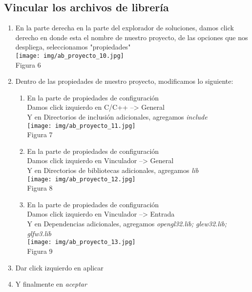 \documentclass[12pt, a4paper]{article}
\begin{document}
\subsection{Vincular los archivos de librería}	
	\begin{enumerate}
	\raggedright 	
	\item En la parte derecha en la parte del explorador de soluciones, damos click derecho en donde esta el nombre de nuestro proyecto, de las opciones que nos despliega, seleccionamos "propiedades" \\[.25cm] 
	\centering 
	\texttt{[image: img/ab\_proyecto\_10.jpg]}\\[.25cm] %
	Figura 6 \\[.5cm]
	\raggedright 	
	\item Dentro de las propiedades de nuestro proyecto, modificamos lo siguiente:
		\begin{enumerate}
			\item En la parte de propiedades de configuración
			\\Damos click izquierdo en C/C++ --> General \\
			Y en Directorios de inclusión adicionales, agregamos {\itshape include} \\[.25cm] 
			\centering 
			\texttt{[image: img/ab\_proyecto\_11.jpg]}\\[.25cm] %
			Figura 7 \\[.5cm]
			\raggedright 
			\item En la parte de propiedades de configuración
			\\Damos click izquierdo en Vinculador --> General \\
			Y en Directorios de bibliotecas adicionales, agregamos {\itshape lib} \\[.25cm] 
			\centering 
			\texttt{[image: img/ab\_proyecto\_12.jpg]}\\[.25cm] %
			Figura 8 \\[.5cm]
			
			\raggedright 
			\item En la parte de propiedades de configuración
			\\Damos click izquierdo en Vinculador --> Entrada \\
			Y en Dependencias adicionales, agregamos {\itshape opengl32.lib; glew32.lib; glfw3.lib} \\[.25cm] 
			\centering 
			\texttt{[image: img/ab\_proyecto\_13.jpg]}\\[.25cm] %
			Figura 9 \\[.5cm]
		\end{enumerate}
		\item Dar click izquierdo en aplicar
		\item Y finalmente en {\itshape aceptar } \\[.5cm]
	\end{enumerate}
\newpage	
			\raggedright 
\end{document}
